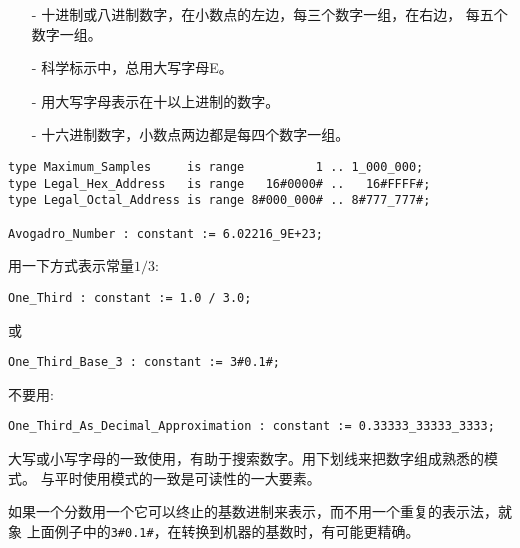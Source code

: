 \begin{blockindent}
\noindent
\begin{itemize}
    \item[-] 十进制或八进制数字，在小数点的左边，每三个数字一组，在右边，
每五个数字一组。
    \item[-] 科学标示中，总用大写字母E。
    \item[-] 用大写字母表示在十以上进制的数字。
    \item[-] 十六进制数字，小数点两边都是每四个数字一组。
\end{itemize}
\end{blockindent}

\begin{blockindent}
\noindent
\begin{lstlisting}
type Maximum_Samples     is range          1 .. 1_000_000;
type Legal_Hex_Address   is range   16#0000# ..   16#FFFF#;
type Legal_Octal_Address is range 8#000_000# .. 8#777_777#;

Avogadro_Number : constant := 6.02216_9E+23;
\end{lstlisting}
用一下方式表示常量$1/3$:
\begin{lstlisting}
One_Third : constant := 1.0 / 3.0;
\end{lstlisting}
或
\begin{lstlisting}
One_Third_Base_3 : constant := 3#0.1#;
\end{lstlisting}
不要用:
\begin{lstlisting}
One_Third_As_Decimal_Approximation : constant := 0.33333_33333_3333;
\end{lstlisting}
\end{blockindent}

\begin{blockindent}
大写或小写字母的一致使用，有助于搜索数字。用下划线来把数字组成熟悉的模式。
与平时使用模式的一致是可读性的一大要素。
\end{blockindent}

\begin{blockindent}
如果一个分数用一个它可以终止的基数进制来表示，而不用一个重复的表示法，就象
上面例子中的\texttt{3\#0.1\#}，在转换到机器的基数时，有可能更精确。
\end{blockindent}

